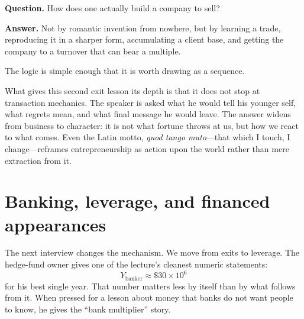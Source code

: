 \textbf{Question.} How does one actually build a company to sell?

\textbf{Answer.} Not by romantic invention from nowhere, but by learning a trade, reproducing it in a sharper form, accumulating a client base, and getting the company to a turnover that can bear a multiple.

The logic is simple enough that it is worth drawing as a sequence.

\begin{figure}[h]
\centering
{}
\end{figure}

What gives this second exit lesson its depth is that it does not stop at transaction mechanics. The speaker is asked what he would tell his younger self, what regrets mean, and what final message he would leave. The answer widens from business to character: it is not what fortune throws at us, but how we react to what comes. Even the Latin motto, \emph{quod tango muto}---that which I touch, I change---reframes entrepreneurship as action upon the world rather than mere extraction from it.

\section{Banking, leverage, and financed appearances}

The next interview changes the mechanism. We move from exits to leverage. The hedge-fund owner gives one of the lecture's cleanest numeric statements:
\begin{equation}
Y_{\text{banker}} \approx \$30 \times 10^6
\end{equation}
for his best single year. That number matters less by itself than by what follows from it. When pressed for a lesson about money that banks do not want people to know, he gives the ``bank multiplier'' story.

